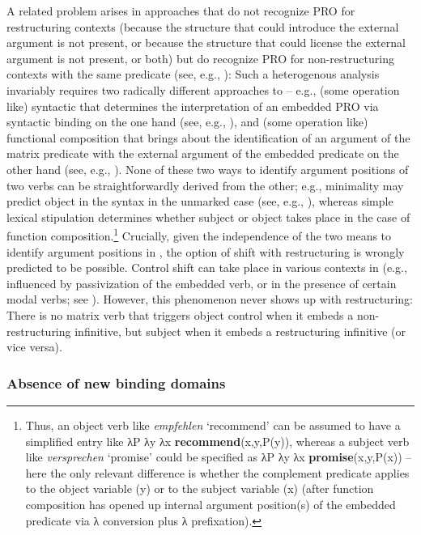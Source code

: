 \documentclass[output=paper]{langsci/langscibook}
\begin{document}
A related problem arises in approaches that do not recognize PRO for
restructuring contexts (because the structure that could introduce the external
argument is not present, or because the structure that could license the
external argument is not present, or both) but do recognize PRO for
non-restructuring contexts with the same predicate (see, e.g.,
\citealt{Haider:10}): Such a heterogenous analysis invariably requires two
radically different approaches to  -- e.g., (some operation like)
syntactic  that determines the interpretation of an embedded PRO via
syntactic binding on the one hand (see, e.g., \citealt{Landau:00}), and (some
operation like) functional composition that brings about the identification of
an argument of the matrix predicate with the external argument of the embedded
predicate on the other hand (see, e.g., \citealt{Stiebels:07:tow}). None of these
two ways to identify argument positions of two verbs can be straightforwardly
derived from the other; e.g., minimality may predict object  in the
syntax in the unmarked case (see, e.g., \citealt{Hornstein2001}), whereas simple
lexical stipulation determines whether subject or object  takes place in
the case of function composition.\footnote{Thus, an object  verb  like
    {\it empfehlen} \enquote*{recommend} can  be assumed to have a simplified
    entry like λP λy λx {\bf recommend}(x,y,P(y)), whereas a subject 
    verb like {\it versprechen} \enquote*{promise} could be specified as λP λy
    λx {\bf promise}(x,y,P(x)) -- here the only relevant difference is whether
    the complement predicate applies to the object variable (y) or to the
    subject variable (x) (after function composition has opened up internal
argument position(s) of the embedded predicate via λ conversion plus λ
prefixation).} Crucially, given the independence of the two means to identify
argument positions in , the option of  shift with restructuring
is wrongly predicted to be possible. Control shift can take place in various
contexts in   (e.g., influenced by passivization of the embedded verb, or
in the presence of certain modal verbs; see
\citealt{Ruzicka:83,Wurmbrand:02,Stiebels:07:tow}). However, this phenomenon never
shows up with restructuring: There is no matrix verb that triggers object
control when it embeds a non-restructuring infinitive, but subject  when
it embeds a restructuring infinitive (or vice versa).


\subsubsection{\label{b3}Absence of new binding domains}
\end{document}

